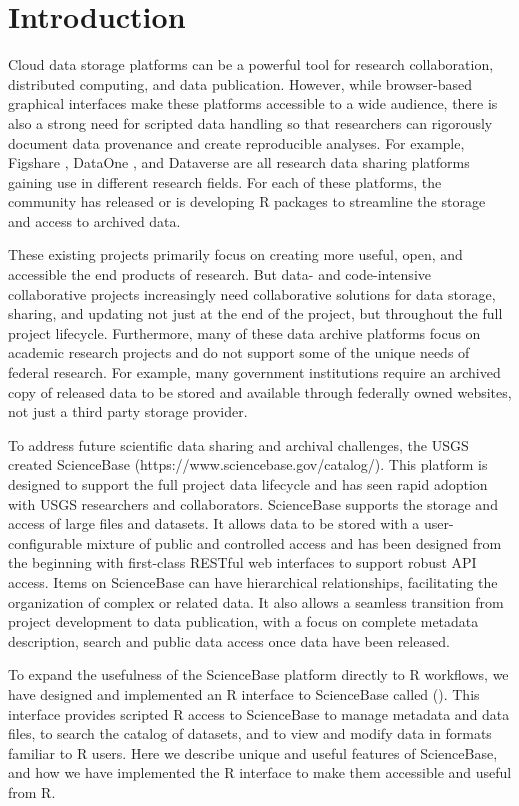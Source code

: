 \section{Introduction}

Cloud data storage platforms can be a powerful tool for research collaboration,
distributed computing, and data publication. However, while browser-based graphical
interfaces make these platforms accessible to a wide audience, there is also
a strong need for scripted data handling so that researchers can rigorously
document data provenance and create reproducible analyses. For example,
Figshare , DataOne , and Dataverse  
are all research data
sharing platforms gaining use in different research fields. For each of these
platforms, the community has released \citep{rfigshare, dvn} or is
developing \citep{dataone} R packages to streamline the storage and access
to archived data.

These existing projects primarily focus on creating more useful, open, and
accessible the end products of research. But data- and code-intensive collaborative projects
increasingly need collaborative solutions for data storage, sharing, and updating
not just at the end of the project, but throughout the full project lifecycle. 
Furthermore, many of these data
archive platforms focus on academic research projects and do not support some
of the unique needs of federal research. For example, many government institutions
require an archived copy of released data to be stored and available through federally
owned websites, not just a third party storage provider.

To address future scientific data sharing and archival challenges, the USGS
created ScienceBase (https://www.sciencebase.gov/catalog/). This platform is
designed to support
the full project data lifecycle and has seen rapid adoption with USGS
researchers and collaborators. ScienceBase supports the storage and access
of large files and datasets. It allows data to be stored with a user-configurable 
mixture of
public and controlled access and has been designed from the beginning with
first-class RESTful web interfaces to support robust API access. Items on ScienceBase 
can have hierarchical relationships, facilitating the organization of complex or related
data. It also allows
a seamless transition from project development to data publication, with
a focus on complete metadata description, search and public data access once 
data have been released.

To expand the usefulness of the ScienceBase platform directly to R workflows, 
we have designed and
implemented an R interface to ScienceBase called  (\cite{sbtools}).
This interface provides scripted R access to ScienceBase to manage metadata and
data files, to search the catalog of datasets, and to view and modify data in
formats familiar to R users.
Here we describe unique and useful features of ScienceBase, and how we have
implemented the R interface to make them accessible and useful from R.
